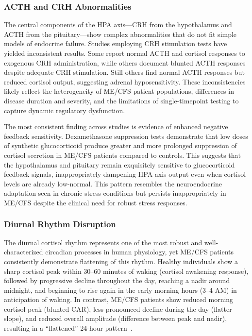 \subsubsection{ACTH and CRH Abnormalities}

The central components of the HPA axis---CRH from the hypothalamus and ACTH from the pituitary---show complex abnormalities that do not fit simple models of endocrine failure. Studies employing CRH stimulation tests have yielded inconsistent results. Some report normal ACTH and cortisol responses to exogenous CRH administration, while others document blunted ACTH responses despite adequate CRH stimulation. Still others find normal ACTH responses but reduced cortisol output, suggesting adrenal hyposensitivity. These inconsistencies likely reflect the heterogeneity of ME/CFS patient populations, differences in disease duration and severity, and the limitations of single-timepoint testing to capture dynamic regulatory dysfunction.

The most consistent finding across studies is evidence of enhanced negative feedback sensitivity. Dexamethasone suppression tests demonstrate that low doses of synthetic glucocorticoid produce greater and more prolonged suppression of cortisol secretion in ME/CFS patients compared to controls. This suggests that the hypothalamus and pituitary remain exquisitely sensitive to glucocorticoid feedback signals, inappropriately dampening HPA axis output even when cortisol levels are already low-normal. This pattern resembles the neuroendocrine adaptation seen in chronic stress conditions but persists inappropriately in ME/CFS despite the clinical need for robust stress responses.

\subsubsection{Diurnal Rhythm Disruption}

\begin{observation}
\label{obs:cortisol-rhythm}
The diurnal cortisol rhythm represents one of the most robust and well-characterized circadian processes in human physiology, yet ME/CFS patients consistently demonstrate flattening of this rhythm. Healthy individuals show a sharp cortisol peak within 30--60 minutes of waking (cortisol awakening response), followed by progressive decline throughout the day, reaching a nadir around midnight, and beginning to rise again in the early morning hours (3--4 AM) in anticipation of waking. In contrast, ME/CFS patients show reduced morning cortisol peak (blunted CAR), less pronounced decline during the day (flatter slope), and reduced overall amplitude (difference between peak and nadir), resulting in a ``flattened'' 24-hour pattern~\cite{cambras2018circadian}.
\end{observation}

